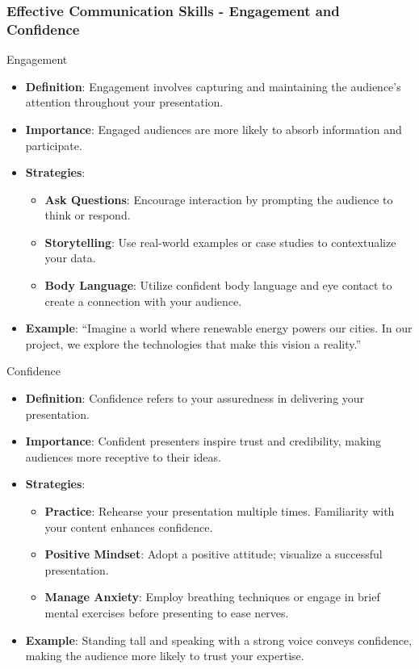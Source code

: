 \documentclass{beamer}
\begin{document}
\begin{frame}[fragile]
    \frametitle{Effective Communication Skills - Engagement and Confidence}
    \begin{block}{Engagement}
        \begin{itemize}
            \item \textbf{Definition}: Engagement involves capturing and maintaining the audience's attention throughout your presentation.
            \item \textbf{Importance}: Engaged audiences are more likely to absorb information and participate.
            \item \textbf{Strategies}:
                \begin{itemize}
                    \item \textbf{Ask Questions}: Encourage interaction by prompting the audience to think or respond.
                    \item \textbf{Storytelling}: Use real-world examples or case studies to contextualize your data.
                    \item \textbf{Body Language}: Utilize confident body language and eye contact to create a connection with your audience.
                \end{itemize}
            \item \textbf{Example}: “Imagine a world where renewable energy powers our cities. In our project, we explore the technologies that make this vision a reality.”
        \end{itemize}
    \end{block}

    \begin{block}{Confidence}
        \begin{itemize}
            \item \textbf{Definition}: Confidence refers to your assuredness in delivering your presentation.
            \item \textbf{Importance}: Confident presenters inspire trust and credibility, making audiences more receptive to their ideas.
            \item \textbf{Strategies}:
                \begin{itemize}
                    \item \textbf{Practice}: Rehearse your presentation multiple times. Familiarity with your content enhances confidence.
                    \item \textbf{Positive Mindset}: Adopt a positive attitude; visualize a successful presentation.
                    \item \textbf{Manage Anxiety}: Employ breathing techniques or engage in brief mental exercises before presenting to ease nerves.
                \end{itemize}
            \item \textbf{Example}: Standing tall and speaking with a strong voice conveys confidence, making the audience more likely to trust your expertise.
        \end{itemize}
    \end{block}
\end{frame}
\end{document}
